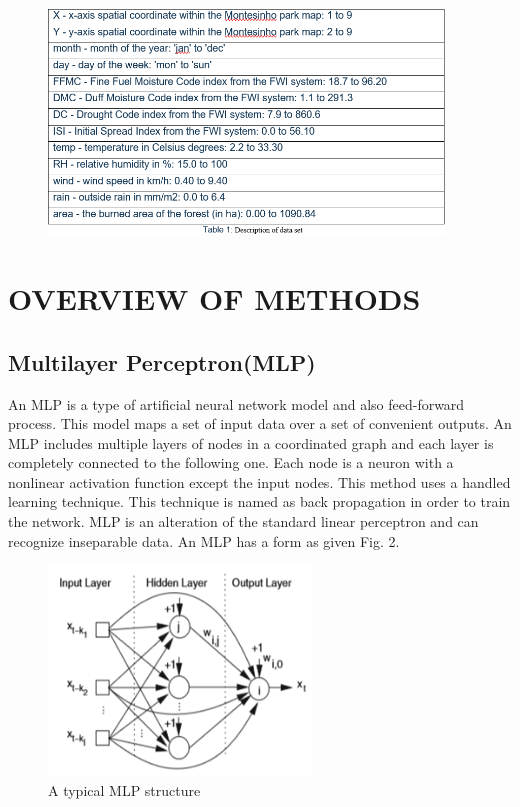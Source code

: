 \documentclass[onecolumn]{article}
\begin{document}
\begin{figure}[htb!]
\centerline
{\includegraphics[width=105mm,scale=1.0]{table1.png}}
\end{figure}

\section{OVERVIEW OF METHODS}
\subsection{Multilayer Perceptron(MLP)}
An MLP is a type of artificial neural network model and also feed-forward process. This model maps a set of input data over a set of convenient outputs. An MLP includes multiple layers of nodes in a coordinated graph and each layer is completely connected to the following one. Each node is a neuron with a nonlinear activation function except the input nodes. This method uses a handled learning technique. This technique is named as back propagation in order to train the network. MLP is an alteration of the standard linear perceptron and can recognize inseparable data. An MLP has a form as given Fig. 2.
\begin{figure}[htb!]
\centerline
{\includegraphics[width=70mm,scale=1.0]{mlp.png}}
\caption{A typical MLP structure}
\end{figure}
\end{document}
